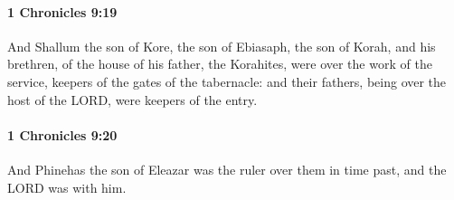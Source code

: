 		\paragraph{1 Chronicles 9:19} %
			\label{1CHRONICLES-9-19}

			And Shallum the son of Kore, the son of Ebiasaph, the son of Korah, and his brethren, of the house of his father, the Korahites, were over the work of the service, keepers of the gates of the tabernacle: and their fathers, being over the host of the LORD, were keepers of the entry.


		\paragraph{1 Chronicles 9:20} %
			\label{1CHRONICLES-9-20}

			And Phinehas the son of Eleazar was the ruler over them in time past, and the LORD was with him.

